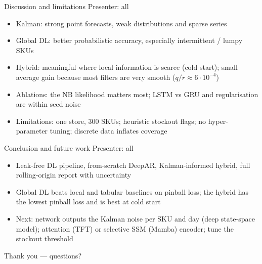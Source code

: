 \documentclass[aspectratio=169,10pt]{beamer}
\newcommand{\who}[1]{\hfill{\small\color{gray}Presenter: #1}}
\begin{document}
\begin{frame}{Discussion and limitations \who{all}}
\begin{itemize}
\item Kalman: strong point forecasts, weak distributions and sparse series
\item Global DL: better probabilistic accuracy, especially intermittent / lumpy SKUs
\item Hybrid: meaningful where local information is scarce (cold start); small average gain because most filters are very smooth ($q/r\approx 6\cdot 10^{-4}$)
\item Ablations: the NB likelihood matters most; LSTM vs GRU and regularisation are within seed noise
\item Limitations: one store, 300 SKUs; heuristic stockout flags; no hyper-parameter tuning; discrete data inflates coverage
\end{itemize}
\end{frame}

\begin{frame}{Conclusion and future work \who{all}}
\begin{itemize}
\item Leak-free DL pipeline, from-scratch DeepAR, Kalman-informed hybrid, full rolling-origin report with uncertainty
\item Global DL beats local and tabular baselines on pinball loss; the hybrid has the lowest pinball loss and is best at cold start
\item Next: network outputs the Kalman noise per SKU and day (deep state-space model); attention (TFT) or selective SSM (Mamba) encoder; tune the stockout threshold
\end{itemize}
\vfill
\centering Thank you --- questions?
\end{frame}
\end{document}
